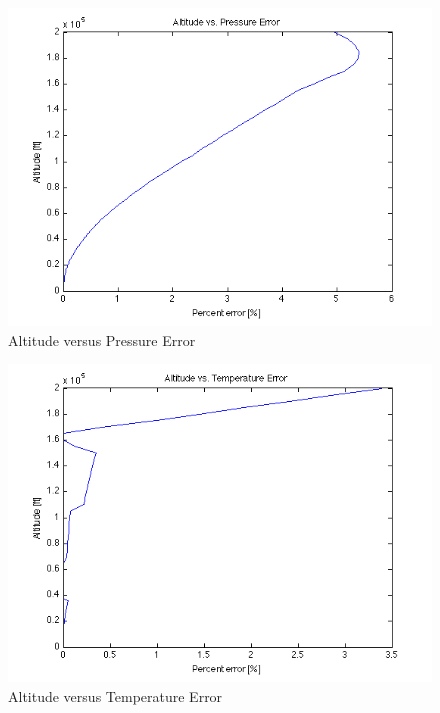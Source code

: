 \documentclass[12pt]{report}
\begin{document}
\begin{figure}[here]
\includegraphics[width=1\textwidth]{AltitudeVsPressureError.png}
\caption{Altitude versus Pressure Error}
\label{fig:Figure5}
\end{figure}

\begin{figure}[here]
\includegraphics[width=1\textwidth]{AltitudeVsTemperatureError.png}
\caption{Altitude versus Temperature Error}
\label{fig:Figure6}
\end{figure}
\end{document}
